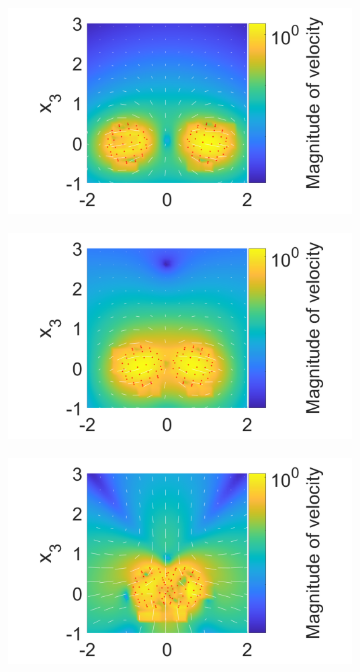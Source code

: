 \begin{figure}
\centering
\begin{subfigure}[b]{0.4\textwidth}
    \centering
    \includegraphics[width=\textwidth]{Images/squirmers/Pair-1.pdf}
    \caption[]{\label{fig:PairA}}
\end{subfigure}
\begin{subfigure}[b]{0.4\textwidth}
    \centering
    \includegraphics[width=\textwidth]{Images/squirmers/Pair-2.pdf}
    \caption[]{\label{fig:PairB}}
\end{subfigure}
\begin{subfigure}[b]{0.4\textwidth}
    \centering
    \includegraphics[width=\textwidth]{Images/squirmers/Pair-3.pdf}

\end{subfigure}
\end{figure}
